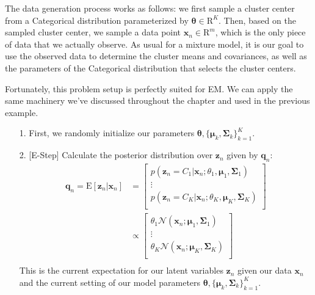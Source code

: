 \documentclass[12pt,letterpaper]{article}
\begin{document}
The data generation process works as follows: we first sample a cluster center from a Categorical distribution parameterized by $\boldsymbol{\theta} \in \mathrm{R}^{K}$. Then, based on the sampled cluster center, we sample a data point $\textbf{x}_n \in \mathrm{R}^{m}$, which is the only piece of data that we actually observe. As usual for a mixture model, it is our goal to use the observed data to determine the cluster means and covariances, as well as the parameters of the Categorical distribution that selects the cluster centers.

Fortunately, this problem setup is perfectly suited for EM. We can apply the same machinery we've discussed throughout the chapter and used in the previous example.
\begin{itemize}
    \item[1.] First, we randomly initialize our parameters $\boldsymbol{\theta}, \{ \boldsymbol{\mu}_k, \boldsymbol{\Sigma}_k \}_{k=1}^{K}$.
    \item[2.] [E-Step] Calculate the posterior distribution over $\textbf{z}_n$ given by $\textbf{q}_n$:
        \begin{align*}
            \textbf{q}_n = \mathrm{E}[\textbf{z}_n | \textbf{x}_n] &= \begin{bmatrix}
                p(\textbf{z}_n = C_1 | \textbf{x}_n; \theta_1, \boldsymbol{\mu}_1, \boldsymbol{\Sigma}_1) \\
                \vdots \\
                p(\textbf{z}_n = C_K | \textbf{x}_n; \theta_K, \boldsymbol{\mu}_K, \boldsymbol{\Sigma}_K) \\
            \end{bmatrix} \\
            &\propto \begin{bmatrix}
                \theta_1 \mathcal{N}(\textbf{x}_n; \boldsymbol{\mu}_1, \boldsymbol{\Sigma}_1) \\
                \vdots \\
                \theta_K \mathcal{N}(\textbf{x}_n; \boldsymbol{\mu}_K, \boldsymbol{\Sigma}_K) \\
            \end{bmatrix} \\
        \end{align*}
        This is the current expectation for our latent variables $\textbf{z}_n$ given our data $\textbf{x}_n$ and the current setting of our model parameters $\boldsymbol{\theta}, \{ \boldsymbol{\mu}_k, \boldsymbol{\Sigma}_k \}_{k=1}^{K}$.

\end{itemize}
\end{document}
